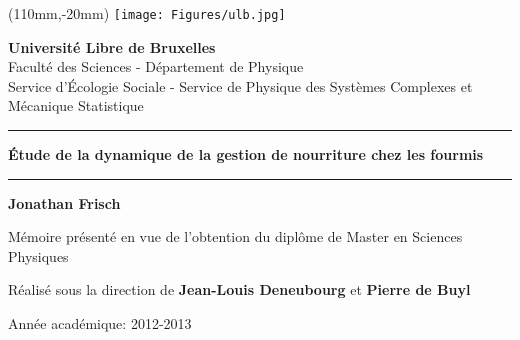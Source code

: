 \begin{titlingpage}




\begin{textblock*}{3cm}(110mm,-20mm)
\texttt{[image: Figures/ulb.jpg]}
\end{textblock*} 


	
  \begin{center}
    {\LARGE \textbf{Universit{\'e} Libre de Bruxelles} \\ }
    \bigskip
    {\Large Faculté des Sciences - Département de Physique\\}
    \bigskip
    {\Large Service d'Écologie Sociale - Service de Physique des Systèmes Complexes et Mécanique Statistique\\}
  \end{center}
\bigskip


  \begin{center}
    \rule{\linewidth}{1pt}\par\vskip 6pt%
    {\huge \textbf{Étude de la dynamique de la gestion de nourriture chez les fourmis}}
    \rule{\linewidth}{1pt}\par\vskip 6pt%

    \bigskip
    {\Large \textbf{Jonathan Frisch}}
    \bigskip
  \end{center}


  \begin{center}

    {\large Mémoire présenté en vue de l'obtention du diplôme de Master en Sciences Physiques\\}
    \bigskip
    \bigskip

    {\large Réalisé sous la direction de \textbf{Jean-Louis Deneubourg} et \textbf{Pierre de Buyl}
      }
  \end{center}
  \bigskip

  \begin{center}
    {\large Année académique: 2012-2013}
  \end{center}
  
  

\end{titlingpage}